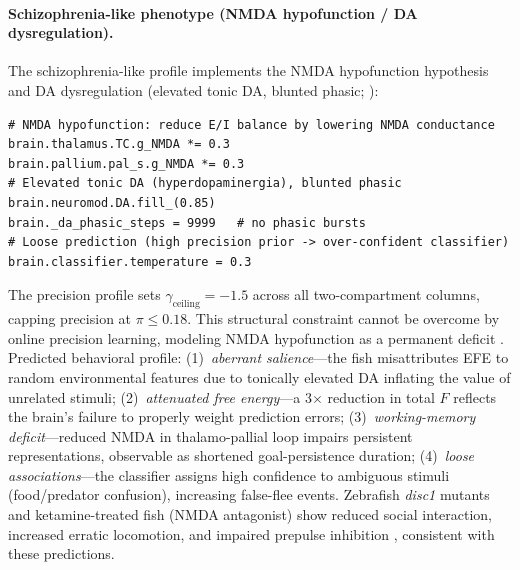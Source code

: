 \documentclass[12pt]{article}
\begin{document}
\paragraph{Schizophrenia-like phenotype (NMDA hypofunction / DA dysregulation).}
The schizophrenia-like profile implements the NMDA hypofunction hypothesis
\citep{krystal1994} and DA dysregulation (elevated tonic DA, blunted
phasic; \citealt{kapur2000}):
\begin{verbatim}
# NMDA hypofunction: reduce E/I balance by lowering NMDA conductance
brain.thalamus.TC.g_NMDA *= 0.3
brain.pallium.pal_s.g_NMDA *= 0.3
# Elevated tonic DA (hyperdopaminergia), blunted phasic
brain.neuromod.DA.fill_(0.85)
brain._da_phasic_steps = 9999   # no phasic bursts
# Loose prediction (high precision prior -> over-confident classifier)
brain.classifier.temperature = 0.3
\end{verbatim}
The precision profile sets $\gamma_\text{ceiling} = -1.5$ across all
two-compartment columns, capping precision at $\pi \leq 0.18$. This
structural constraint cannot be overcome by online precision learning,
modeling NMDA hypofunction as a permanent deficit \citep{adams2013}.
Predicted behavioral profile: (1)~\emph{aberrant salience}---the fish
misattributes EFE to random environmental features due to tonically elevated
DA inflating the value of unrelated stimuli; (2)~\emph{attenuated free
energy}---a 3$\times$ reduction in total $F$ reflects the brain's failure
to properly weight prediction errors; (3)~\emph{working-memory
deficit}---reduced NMDA in thalamo-pallial loop impairs persistent
representations, observable as shortened goal-persistence duration;
(4)~\emph{loose associations}---the classifier assigns high confidence to
ambiguous stimuli (food/predator confusion), increasing false-flee events.
Zebrafish \textit{disc1} mutants and ketamine-treated fish (NMDA antagonist)
show reduced social interaction, increased erratic locomotion, and impaired
prepulse inhibition \citep{kronenberg2005,irons2010}, consistent with these
predictions.
\end{document}
